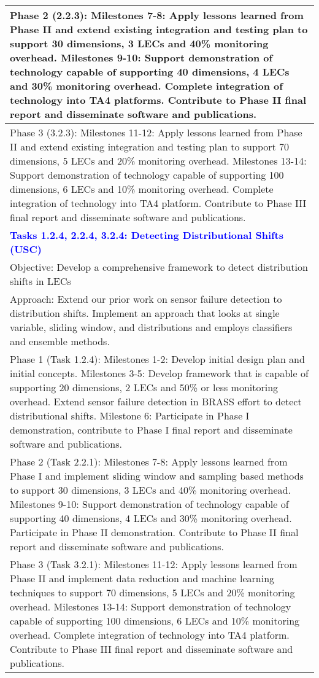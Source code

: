{\begin{longtable} {|p{\textwidth} | }
Phase 2 (2.2.3): Milestones 7-8:  Apply lessons learned from Phase II and extend existing integration and testing plan to support 30 dimensions, 3 LECs and 40\% monitoring overhead.  Milestones 9-10:  Support demonstration of technology capable of supporting 40 dimensions, 4 LECs and 30\% monitoring overhead.  Complete integration of technology into TA4 platforms.  Contribute to Phase II final report and disseminate software and publications. \\ \hline
Phase 3 (3.2.3): Milestones 11-12:  Apply lessons learned from Phase II and extend existing integration and testing plan to support 70 dimensions, 5 LECs and 20\% monitoring overhead.  Milestones 13-14:  Support demonstration of technology capable of supporting 100 dimensions, 6 LECs and 10\% monitoring overhead.  Complete integration of technology into TA4 platform.  Contribute to Phase III final report and disseminate software and publications. \\ \hline
\textcolor{blue} {\footnotesize {\textbf{Tasks 1.2.4, 2.2.4, 3.2.4: Detecting Distributional Shifts (USC)}}} \\ \hline
Objective:  Develop a comprehensive framework to detect distribution shifts in LECs \\ \hline
Approach: Extend our prior work on sensor failure detection to distribution shifts.  Implement an approach that looks at single variable, sliding window, and distributions and employs classifiers and ensemble methods. \\ \hline
Phase 1 (Task 1.2.4): Milestones 1-2:  Develop initial design plan and initial concepts.  Milestones 3-5:   Develop framework that is capable of supporting 20 dimensions, 2 LECs and 50\% or less monitoring overhead. Extend sensor failure detection in BRASS effort to detect distributional shifts.  Milestone 6: Participate in Phase I demonstration, contribute to Phase I final report and disseminate software and publications. \\ \hline
Phase 2 (Task 2.2.1): Milestones 7-8:  Apply lessons learned from Phase I and  implement sliding window and sampling based methods to support 30 dimensions, 3 LECs and 40\% monitoring overhead.  Milestones 9-10:  Support demonstration of technology capable of supporting 40 dimensions, 4 LECs and 30\% monitoring overhead.  Participate in Phase II demonstration.  Contribute to Phase II final report and disseminate software and publications. \\ \hline
Phase 3 (Task 3.2.1): Milestones 11-12:  Apply lessons learned from Phase II and implement data reduction and machine learning techniques to support 70 dimensions, 5 LECs and 20\% monitoring overhead.  Milestones 13-14:  Support demonstration of technology capable of supporting 100 dimensions, 6 LECs and 10\% monitoring overhead.  Complete integration of technology into TA4 platform.  Contribute to Phase III final report and disseminate software and publications. \\ \hline

\end{longtable}}
